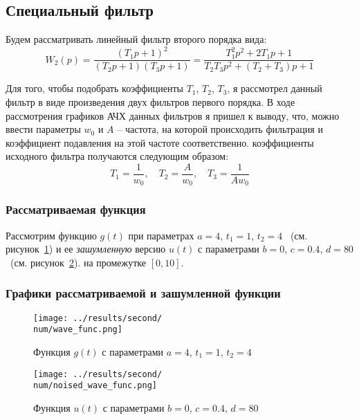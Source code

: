 \subsection{Специальный фильтр}

Будем рассматривать линейный фильтр второго порядка вида: 
\begin{equation}
    W_2(p) = \frac{(T_1p + 1)^2}{(T_2p + 1)(T_3p + 1)} = \frac{T_1^2p^2 + 2T_1p + 1}{T_2T_3p^2 + (T_2 + T_3)p + 1}
\end{equation}

Для того, чтобы подобрать коэффициенты $T_1$, $T_2$, $T_3$, я рассмотрел данный фильтр в виде произведения двух фильтров первого порядка. 
В ходе рассмотрения графиков АЧХ данных фильтров я пришел к выводу, что, можно ввести параметры $w_0$ и $A$ -- частота, на которой происходить фильтрация и коэффициент подавления на этой частоте соответственно.
коэффициенты исходного фильтра получаются следующим образом:
\begin{equation}
    T_1 = \frac{1}{w_0}, \quad T_2 = \frac{A}{w_0}, \quad T_3 = \frac{1}{Aw_0}
    \label{eq:t_params}
\end{equation}

\def\num{6}
\def\a{4}
\def\from{1}
\def\to{4}
\def\b{0}
\def\c{0.4}
\def\d{80}
\def\L{10}
\def\A{30}
\def\Wz{80}
\def\Tf{\fpeval{round(1 / \Wz, 7)}}
\def\Ts{\fpeval{round(\A / \Wz, 7)}}
\def\Tt{\fpeval{round(1 / (\A * \Wz), 7)}}

\subsubsection{Рассматриваемая функция}
Рассмотрим функцию $g(t)$ при параметрах $a=\a$, $t_1 = \from$, $t_2 = \to$ ~(см. рисунок~\ref{fig:wave_func_\num}) 
и ее \textit{зашумленную} версию $u(t)$ с параметрами $b = \b$, $c = \c$, $d = \d$ ~(см. рисунок~\ref{fig:noised_wave_func_\num}).
на промежутке $[0,\L]$. 

\subsubsection{Графики рассматриваемой и зашумленной функции}
\begin{figure}[ht!]
    \centering
    \texttt{[image: ../results/second/\\num/wave\_func.png]}
    \caption{Функция $g(t)$ с параметрами $a = \a$, $t_1 = \from$, $t_2 = \to$}
    \label{fig:wave_func_\num}
\end{figure}

\begin{figure}[ht!]
    \centering
    \texttt{[image: ../results/second/\\num/noised\_wave\_func.png]}
    \caption{Функция $u(t)$ с параметрами $b = \b$, $c = \c$, $d = \d$}
    \label{fig:noised_wave_func_\num}
\end{figure}

